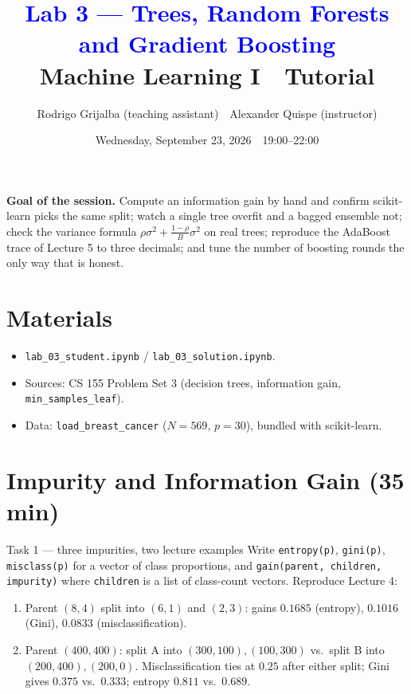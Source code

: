 \documentclass[11pt]{article}
\title{\textcolor{blue}{Lab 3 --- Trees, Random Forests and Gradient Boosting}\\[4pt]
\large Machine Learning I \,\textperiodcentered\, Tutorial}
\author{Rodrigo Grijalba (teaching assistant) \,\textperiodcentered\, Alexander Quispe (instructor)}
\date{Wednesday, September 23, 2026 \,\textperiodcentered\, 19:00--22:00}
\begin{document}
\maketitle

\begin{keypoint}
\textbf{Goal of the session.} Compute an information gain by hand and confirm scikit-learn picks the
same split; watch a single tree overfit and a bagged ensemble not; check the variance formula
$\rho\sigma^2+\frac{1-\rho}{B}\sigma^2$ on real trees; reproduce the AdaBoost trace of Lecture 5 to
three decimals; and tune the number of boosting rounds the only way that is honest.
\end{keypoint}

\section*{Materials}
\begin{itemize}[nosep]
  \item \texttt{lab\_03\_student.ipynb} / \texttt{lab\_03\_solution.ipynb}.
  \item Sources: CS 155 Problem Set 3 (decision trees, information gain, \texttt{min\_samples\_leaf}).
  \item Data: \texttt{load\_breast\_cancer} ($N=569$, $p=30$), bundled with scikit-learn.
\end{itemize}

\section{Impurity and Information Gain (35 min)}

\begin{task}{Task 1 --- three impurities, two lecture examples}
Write \texttt{entropy(p)}, \texttt{gini(p)}, \texttt{misclass(p)} for a vector of class proportions, and
\texttt{gain(parent, children, impurity)} where \texttt{children} is a list of class-count vectors.
Reproduce Lecture 4:
\begin{enumerate}[nosep]
  \item Parent $(8,4)$ split into $(6,1)$ and $(2,3)$: gains $0.1685$ (entropy), $0.1016$ (Gini), $0.0833$ (misclassification).
  \item Parent $(400,400)$: split A into $(300,100),(100,300)$ vs.\ split B into $(200,400),(200,0)$.
        Misclassification ties at $0.25$ after either split; Gini gives $0.375$ vs.\ $0.333$; entropy $0.811$ vs.\ $0.689$.
\end{enumerate}
\end{task}
\end{document}
